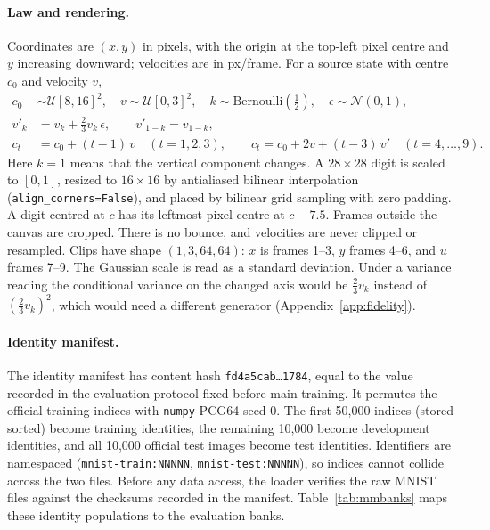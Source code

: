 \paragraph{Law and rendering.} Coordinates are $(x,y)$ in pixels, with the origin at the top-left pixel centre and $y$ increasing downward; velocities are in px/frame. For a source state with centre $c_0$ and velocity $v$,
\begin{align*}
c_0&\sim\mathcal U[8,16]^2,\quad v\sim\mathcal U[0,3]^2,\quad k\sim\mathrm{Bernoulli}(\tfrac12),\quad \epsilon\sim\mathcal N(0,1),\\
v'_k&=v_k+\tfrac23 v_k\,\epsilon,\qquad v'_{1-k}=v_{1-k},\\
c_t&=c_0+(t-1)\,v\quad(t=1,2,3),\qquad c_t=c_0+2v+(t-3)\,v'\quad(t=4,\dots,9).
\end{align*}
Here $k=1$ means that the vertical component changes. A $28{\times}28$ digit is scaled to $[0,1]$, resized to $16{\times}16$ by antialiased bilinear interpolation (\texttt{align\_corners=False}), and placed by bilinear grid sampling with zero padding. A digit centred at $c$ has its leftmost pixel centre at $c-7.5$. Frames outside the canvas are cropped. There is no bounce, and velocities are never clipped or resampled. Clips have shape $(1,3,64,64)$: $x$ is frames 1--3, $y$ frames 4--6, and $u$ frames 7--9. The Gaussian scale is read as a standard deviation. Under a variance reading the conditional variance on the changed axis would be $\tfrac23v_k$ instead of $(\tfrac23v_k)^2$, which would need a different generator (Appendix~\ref{app:fidelity}).

\paragraph{Identity manifest.} The identity manifest has content hash \texttt{fd4a5cab\ldots1784}, equal to the value recorded in the evaluation protocol fixed before main training. It permutes the official training indices with \texttt{numpy} PCG64 seed 0. The first 50{,}000 indices (stored sorted) become training identities, the remaining 10{,}000 become development identities, and all 10{,}000 official test images become test identities. Identifiers are namespaced (\texttt{mnist-train:NNNNN}, \texttt{mnist-test:NNNNN}), so indices cannot collide across the two files. Before any data access, the loader verifies the raw MNIST files against the checksums recorded in the manifest. Table~\ref{tab:mmbanks} maps these identity populations to the evaluation banks.

